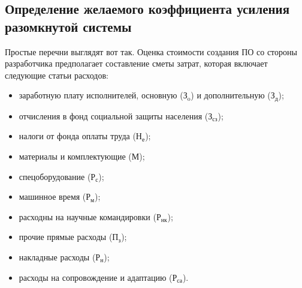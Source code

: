 \subsection{Определение желаемого коэффициента усиления разомкнутой системы} 
\label{sec:determ_factor}
Простые перечни выглядят вот так. 
Оценка стоимости создания ПО со стороны разработчика предполагает составление сметы затрат, которая включает следующие статьи расходов:
\begin{itemize}

  \item заработную плату исполнителей, основную ($ \text{З}_{\text{o}} $) и дополнительную ($\text{З}_{\text{д}} $);

  \item отчисления в фонд социальной защиты населения ($ \text{З}_\text{сз} $);

  \item налоги от фонда оплаты труда ($ \text{Н}_\text{е} $);

  \item материалы и комплектующие ($ \text{М} $);

  \item спецоборудование ($ \text{Р}_\text{с} $);

  \item машинное время ($ \text{Р}_\text{м} $);

  \item расходны на научные командировки ($ \text{Р}_\text{нк} $);

  \item прочие прямые расходы ($ \text{П}_\text{з} $);

  \item накладные расходы ($ \text{Р}_\text{н} $);

  \item расходы на сопровождение и адаптацию ($ \text{Р}_\text{са} $).

\end{itemize}

